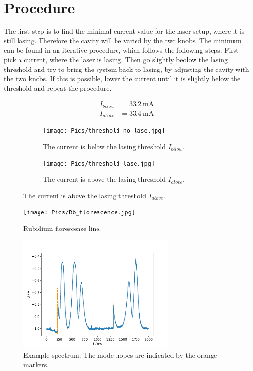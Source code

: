 \section{Procedure}
\label{sec:Procedure}

The first step is to find the minimal current value for the laser setup, where
it is still lasing. Therefore the cavity will be varied by the two knobs.
The minimum can be found in an iterative procedure, which follows the following
steps. First pick a current, where the laser is lasing.
Then go slightly beolow the lasing threshold and try to bring the system back to lasing,
by adjusting the cavity with the two knobs.
If this is possible, lower the current
until it is slightly below the threshold and repeat the procedure.


\begin{align}
  \label{eqn:nolase}
  I_{below} &= \SI{33.2}{\milli\ampere}\\
  I_{above} &= \SI{33.4}{\milli\ampere}
\end{align}

\begin{figure}
  \centering
  \begin{subfigure}{0.48\textwidth}
    \centering
    \texttt{[image: Pics/threshold\_no\_lase.jpg]}
    \caption{The current is below the lasing threshold $I_{below}$.}
    \label{fig:no_lase}
  \end{subfigure}
  \begin{subfigure}{0.48\textwidth}
    \centering
    \texttt{[image: Pics/threshold\_lase.jpg]}
    \caption{The current is above the lasing threshold $I_{above}$.}
    \label{fig:lase}
  \end{subfigure}
\end{figure}


\begin{figure}
  \centering
  \texttt{[image: Pics/Rb\_florescence.jpg]}
  \caption{Rubidium florescense line.}
  \label{fig:florescence}
\end{figure}

\begin{figure}
  \centering
  \includegraphics[width=0.7\textwidth]{Pics/example_spectrum_hop.pdf}
  \caption{Example spectrum. The mode hopes are indicated by the orange markers.}
  \label{fig:example}
\end{figure}

